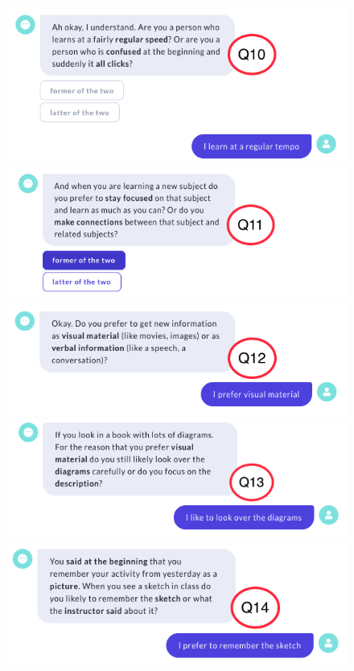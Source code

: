 \begin{figure}[H]
  \centering
  \includegraphics[width=0.7\linewidth]{images/Talk_roterMarker/T10.png}
  \includegraphics[width=0.7\linewidth]{images/Talk_roterMarker/T11.png}
  \includegraphics[width=0.7\linewidth]{images/Talk_roterMarker/T12.png}
  \includegraphics[width=0.7\linewidth]{images/Talk_roterMarker/T13.png}
  \includegraphics[width=0.7\linewidth]{images/Talk_roterMarker/T14.png}
  \label{fig:GesprächIII}
\end{figure} 
